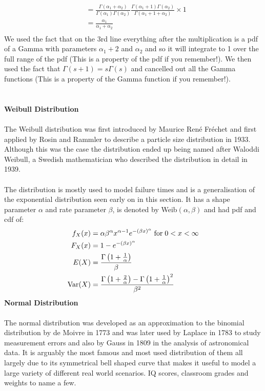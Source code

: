 \documentclass[,oneside]{article}
\begin{document}
\begin{enumerate}
\begin{align*}
&=\frac{\Gamma(\alpha_1 + \alpha_2)}{\Gamma(\alpha_1)\Gamma(\alpha_2)} \frac{\Gamma(\alpha_1 +1)\Gamma(\alpha_2)}{\Gamma(\alpha_1 +1 + \alpha_2)} \times 1\\
&= \frac{\alpha_1}{\alpha_1 + \alpha_2}\\
\end{align*}
We used the fact that on the 3rd line everything after the multiplication is a pdf of a Gamma with parameters $\alpha_1 +2$ and $\alpha_2$ and so it will integrate to 1 over the full range of the pdf (This is a property of the pdf if you remember!). We then used the fact that $\Gamma(s+1)=s\Gamma(s)$ and cancelled out all the Gamma functions (This is a property of the Gamma function if you remember!).\\ \\  \\
\textbf{Weibull Distribution}\\ \\
The Weibull distribution was first introduced by Maurice René Fréchet and first applied by Rosin and Rammler to describe a particle size distribution in 1933. Although this was the case the distribution ended up being named after Waloddi Weibull, a Swedish mathematician who described the distribution in detail in 1939.\\ \\
The distribution is mostly used to model failure times and is a generalisation of the exponential distribution seen early on in this section. It has a shape parameter $\alpha$ and rate parameter $\beta$, is denoted by Weib$(\alpha,\beta)$ and had pdf and cdf of:
\begin{align*}
f_X(x) &= \alpha \beta^{\alpha} x^{\alpha-1}e^{-(\beta x)^{\alpha}} \hspace{0.1cm} \text{for} \hspace{0.1cm} 0 < x < \infty \\
F_X(x) &= 1-e^{-(\beta x)^{\alpha}} \\
E(X)&=\frac{\Gamma \left (1+\frac{1}{\alpha} \right )}{\beta}\\
\text{Var}(X) &= \frac{\Gamma \left (1+\frac{2}{\alpha} \right ) - \Gamma \left (1+\frac{1}{\alpha} \right )^2}{\beta^2}
\end{align*}
\textbf{Normal Distribution}\\ \\
The normal distribution was developed as an approximation to the binomial distribution by de Moivre in 1773 and was later used by Laplace in 1783 to study measurement errors and also by Gauss in 1809 in the analysis of astronomical data. It is arguably the most famous and most used distribution of them all largely due to its symmetrical bell shaped curve that makes it useful to model a large variety of different real world scenarios. IQ scores, classroom grades and weights to name a few.\\ \\

\end{enumerate}
\end{document}
